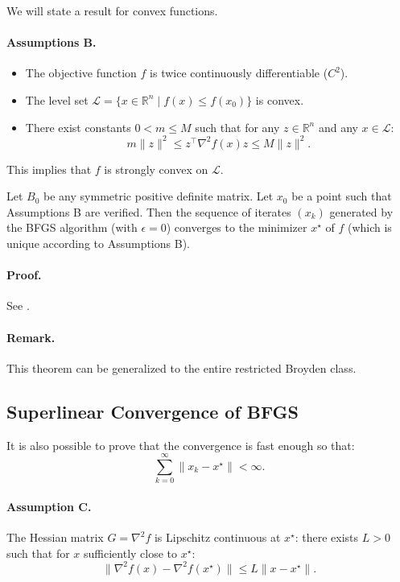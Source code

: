 We will state a result for convex functions.

\paragraph{Assumptions B.}
\begin{itemize}
    \item The objective function $f$ is twice continuously differentiable ($C^2$).
    \item The level set $\mathcal{L} = \{ x \in \mathbb{R}^n \mid f(x) \le f(x_0) \}$ is convex.
    \item There exist constants $0 < m \le M$ such that for any $z \in \mathbb{R}^n$ and any $x \in \mathcal{L}$:
    \begin{equation}
        m \|z\|^2 \le z^\top \nabla^2 f(x) z \le M \|z\|^2.
    \end{equation}
\end{itemize}
This implies that $f$ is strongly convex on $\mathcal{L}$.

\begin{theoreme}
    Let $B_0$ be any symmetric positive definite matrix.
    Let $x_0$ be a point such that Assumptions B are verified.
    Then the sequence of iterates $(x_k)$ generated by the BFGS algorithm (with $\epsilon = 0$) converges to the minimizer $x^\star$ of $f$ (which is unique according to Assumptions B).
\end{theoreme}

\paragraph{Proof.} See \textit{\cite{nocedal2006numerical}}.

\paragraph{Remark.}
This theorem can be generalized to the entire restricted Broyden class.

\subsection{Superlinear Convergence of BFGS}

It is also possible to prove that the convergence is fast enough so that:
\[
    \sum_{k=0}^\infty \|x_k - x^\star\| < \infty.
\]

\paragraph{Assumption C.}
The Hessian matrix $G = \nabla^2 f$ is Lipschitz continuous at $x^\star$: there exists $L > 0$ such that for $x$ sufficiently close to $x^\star$:
\[
    \| \nabla^2 f(x) - \nabla^2 f(x^\star) \| \le L \| x - x^\star \|.
\]

